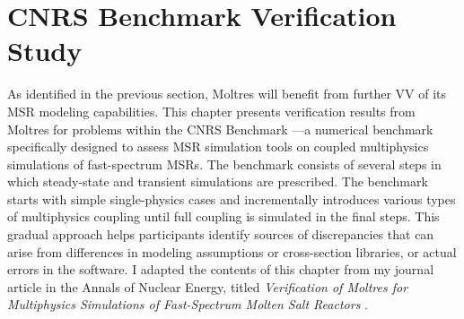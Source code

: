 \section{CNRS Benchmark Verification Study} \label{sec:cnrs-benchmark}

As identified in the previous section,
Moltres will benefit from further \gls{VV} of its
\gls{MSR} modeling capabilities. This chapter presents verification
results from Moltres for problems within the CNRS Benchmark
\cite{tiberga_results_2020}---a numerical benchmark specifically designed to
assess \gls{MSR} simulation tools on coupled multiphysics simulations of
fast-spectrum \glspl{MSR}. The benchmark consists of several steps in which
steady-state and transient simulations are prescribed. The benchmark starts with simple
single-physics cases and incrementally introduces various types of
multiphysics coupling until full coupling is simulated in the final steps. This
gradual approach helps participants identify sources of discrepancies
that can arise from differences in modeling assumptions or
cross-section libraries, or actual errors in the software. I adapted the
contents of this chapter from my journal article in the Annals of Nuclear Energy, titled
\textit{Verification of Moltres for Multiphysics Simulations of Fast-Spectrum
Molten Salt Reactors}
\cite{park_verification_2022}.





